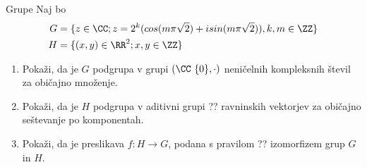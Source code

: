 \begin{frame}{Grupe}
	Naj bo
	\begin{align*}
	G &= \{z \in \CC; z=2^k(cos(m\pi\sqrt{2}) + i sin(m\pi\sqrt{2})), k, m \in \ZZ\} \\
	H &= \{(x, y) \in \RR^2; x,y \in \ZZ\} 
	\end{align*}
	\begin{enumerate}
		\item
			Pokaži, da je $G$ podgrupa v grupi \( (\CC \ \{0\},\cdot) \)
			neničelnih kompleksnih števil za običajno množenje.
		\item
			Pokaži, da je $H$ podgrupa v aditivni grupi ??
			ravninskih vektorjev za običajno seštevanje po komponentah.
		\item
			Pokaži, da je preslikava $f:H\to G$, podana s pravilom
			??
			izomorfizem grup $G$ in $H$.
	\end{enumerate}
\end{frame}
